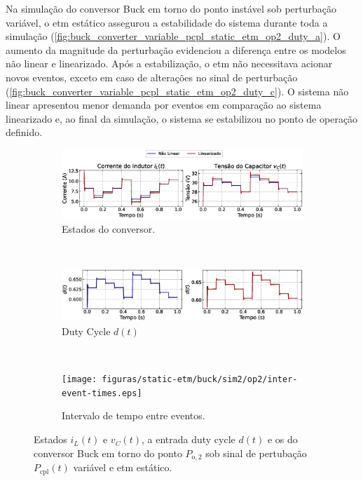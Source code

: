 Na simulação do conversor Buck em torno do ponto instável sob perturbação variável, o \acrshort{etm} estático assegurou a estabilidade do sistema durante toda a simulação (\autoref{fig:buck_converter_variable_pcpl_static_etm_op2_duty_a}). O aumento da magnitude da perturbação evidenciou a diferença entre os modelos não linear e linearizado. Após a estabilização, o \acrshort{etm} não necessitava acionar novos eventos, exceto em caso de alterações no sinal de perturbação (\autoref{fig:buck_converter_variable_pcpl_static_etm_op2_duty_c}). O sistema não linear apresentou menor demanda por eventos em comparação ao sistema linearizado e, ao final da simulação, o sistema se estabilizou no ponto de operação definido.

\begin{figure}[H]
  \centering
  \captionsetup{justification=centering}
  \begin{subfigure}{1.\textwidth}
    \centering
    \includegraphics[width=1.\textwidth]{figuras/static-etm/buck/sim2/op2/result.eps}
    \caption{Estados do conversor.}
    \label{fig:buck_converter_variable_pcpl_static_etm_op2_duty_a}
  \end{subfigure}
  \\[6pt]
  \begin{subfigure}{1.\textwidth}
    \centering
    \includegraphics[width=1.\textwidth]{figuras/static-etm/buck/sim2/op2/duty-cycle.eps}
    \caption{Duty Cycle $d(t)$}
    \label{fig:buck_converter_variable_pcpl_static_etm_op2_duty_b}
  \end{subfigure}
  \\[6pt]
  \begin{subfigure}{1.\textwidth}
    \centering
    \texttt{[image: figuras/static-etm/buck/sim2/op2/inter-event-times.eps]}
    \caption{Intervalo de tempo entre eventos.}
    \label{fig:buck_converter_variable_pcpl_static_etm_op2_duty_c}
  \end{subfigure}
  \caption{Estados $i_L(t)$ e $v_C(t)$, a entrada duty cycle $d(t)$ e os  do conversor Buck em torno do ponto $P_{\mathrm{o}, 2}$ sob sinal de pertubação $P_{\mathrm{cpl}}(t)$ variável e \acrshort{etm} estático.}
\end{figure}

